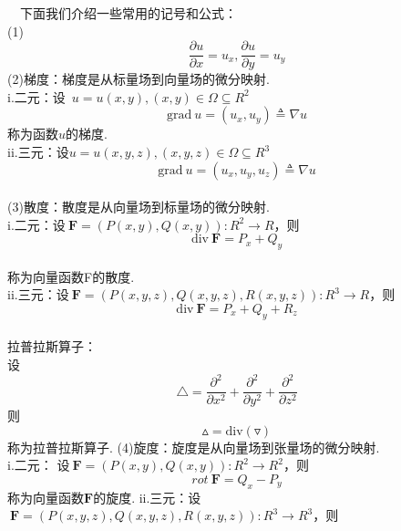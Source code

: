 \documentclass[UTF8]{ctexart}
\begin{document}
~~下面我们介绍一些常用的记号和公式：\\
(1)
\begin{equation*}
\frac{\partial u}{\partial x}=u_x,\frac{\partial u}{\partial y}=u_y
\end{equation*}
(2)梯度：梯度是从标量场到向量场的微分映射.\\
i.二元：设\ $u=u(x,y),(x,y)\in\Omega\subseteq R^2$
\begin{equation*}
\mathrm{grad}\ u=(u_x,u_y)\triangleq\nabla u
\end{equation*}
称为函数$u$的梯度.\\
ii.三元：设$u=u(x,y,z),(x,y,z)\in\Omega\subseteq R^3$
\begin{equation*}
\mathrm{grad}\ u=(u_x,u_y,u_z)\triangleq\nabla u
\end{equation*}\\
(3)散度：散度是从向量场到标量场的微分映射.\\
i.二元：设$\ \bm F=(P(x,y),Q(x,y)):R^2\rightarrow R$，则\\
\begin{equation*}
\mathrm{div}\ \bm F=P_x+Q_y
\end{equation*}\\
称为向量函数F的散度.\\
ii.三元：设$\ \bm F=(P(x,y,z),Q(x,y,z),R(x,y,z)):R^3\rightarrow R$，则\\
\begin{equation*}
\mathrm{div}\ \bm F=P_x+Q_y+R_z
\end{equation*}\\
拉普拉斯算子：\\
设\\
\begin{equation*}
\triangle=\frac{\partial^2}{\partial x^2}+\frac{\partial^2}{\partial y^2}+\frac{\partial^2}{\partial z^2}
\end{equation*}
则\\
\begin{equation*}
\vartriangle=\mathrm{div}(\triangledown)
\end{equation*}
称为拉普拉斯算子.
(4)旋度：旋度是从向量场到张量场的微分映射.\\
i.二元： 设$\ \bm F=(P(x,y),Q(x,y)):R^2\rightarrow R^2$，则\\
\begin{equation*}
rot\ \bm F=Q_x-P_y
\end{equation*}
称为向量函数$\bm F$的旋度.
ii.三元：设$\ \bm F=(P(x,y,z),Q(x,y,z),R(x,y,z)):R^3\rightarrow R^3$，则\\
\end{document}
